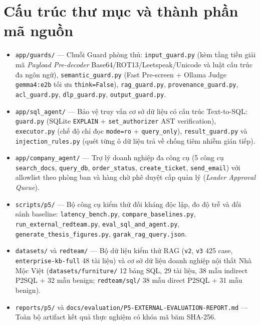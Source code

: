 \chapter{Cấu trúc thư mục và thành phần mã nguồn}
\label{ap:source-tree}

\begin{itemize}
    \item \texttt{app/\allowbreak guards/} --- Chuỗi Guard phòng thủ: \texttt{input\_\allowbreak guard.\allowbreak py} (kèm tầng tiền giải mã \emph{Payload Pre-decoder} Base64/ROT13/Leetspeak/Unicode và luật cấu trúc đa ngôn ngữ), \texttt{semantic\_\allowbreak guard.\allowbreak py} (Fast Pre-screen + Ollama Judge \texttt{gemma4:e2b} tối ưu \texttt{think=False}), \texttt{rag\_\allowbreak guard.\allowbreak py}, \texttt{provenance\_\allowbreak guard.\allowbreak py}, \texttt{acl\_\allowbreak guard.\allowbreak py}, \texttt{dlp\_\allowbreak guard.\allowbreak py}, \texttt{output\_\allowbreak guard.\allowbreak py}.
    \item \texttt{app/\allowbreak sql\_\allowbreak agent/} --- Bảo vệ truy vấn cơ sở dữ liệu có cấu trúc Text-to-SQL: \texttt{guard.py} (SQLite \texttt{EXPLAIN} + \texttt{set\_\allowbreak authorizer} AST verification), \texttt{executor.\allowbreak py} (chế độ chỉ đọc \texttt{mode=ro} + \texttt{query\_\allowbreak only}), \texttt{result\_\allowbreak guard.\allowbreak py} và \texttt{injection\_\allowbreak rules.\allowbreak py} (quét từng ô dữ liệu trả về chống tiêm nhiễm gián tiếp).
    \item \texttt{app/\allowbreak company\_\allowbreak agent/} --- Trợ lý doanh nghiệp đa công cụ (5 công cụ \texttt{search\_\allowbreak docs}, \texttt{query\_db}, \texttt{order\_\allowbreak status}, \texttt{create\_\allowbreak ticket}, \texttt{send\_\allowbreak email}) với allowlist theo phòng ban và hàng chờ phê duyệt cấp quản lý (\emph{Leader Approval Queue}).
    \item \texttt{scripts/\allowbreak p5/} --- Bộ công cụ kiểm thử đối kháng độc lập, đo độ trễ và đối sánh baseline: \texttt{latency\_\allowbreak bench.\allowbreak py}, \texttt{compare\_\allowbreak baselines.\allowbreak py}, \texttt{run\_\allowbreak external\_\allowbreak redteam.\allowbreak py}, \texttt{eval\_\allowbreak sql\_\allowbreak and\_\allowbreak agent.\allowbreak py}, \texttt{generate\_\allowbreak thesis\_\allowbreak figures.\allowbreak py}, \texttt{garak\_\allowbreak rag\_\allowbreak query.\allowbreak json}.
    \item \texttt{datasets/} và \texttt{redteam/} --- Bộ dữ liệu kiểm thử RAG (\texttt{v2}, \texttt{v3} 425 case, \texttt{enterprise-\allowbreak kb-\allowbreak full} 48 tài liệu) và cơ sở dữ liệu doanh nghiệp nội thất Nhà Mộc Việt (\texttt{datasets/\allowbreak furniture/} 12 bảng SQL, 29 tài liệu, 38 mẫu indirect P2SQL + 32 mẫu benign; \texttt{redteam/\allowbreak sql/} 38 mẫu direct P2SQL + 31 mẫu benign).
    \item \texttt{reports/\allowbreak p5/} và \texttt{docs/\allowbreak evaluation/\allowbreak P5-\allowbreak EXTERNAL-\allowbreak EVALUATION-\allowbreak REPORT.\allowbreak md} --- Toàn bộ artifact kết quả thực nghiệm có khóa mã băm SHA-256.
\end{itemize}

